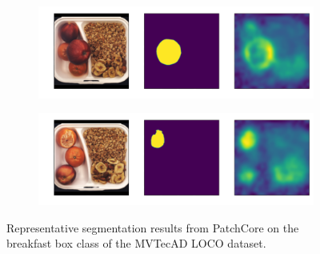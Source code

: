 \begin{figure}[htbp]
\begin{subfigure}[b]{0.3\textwidth}
    \end{subfigure}
    \begin{subfigure}[b]{0.3\textwidth}
        \centering
        \includegraphics[width=\textwidth]{figures/locopatchcoreresults/breakfast_box_test_structural_anomalies_024.png}


    \end{subfigure}
    \begin{subfigure}[b]{0.3\textwidth}
        \centering
        \includegraphics[width=\textwidth]{figures/locopatchcoreresults/breakfast_box_test_structural_anomalies_070.png}


    \end{subfigure}
    \caption{Representative segmentation results from PatchCore \cite{patchCore2022} on the breakfast box class of the MVTecAD LOCO \cite{LOCODentsAndScratchesBergmann2022} dataset.}
    \label{fig:PCBB}
\end{figure}